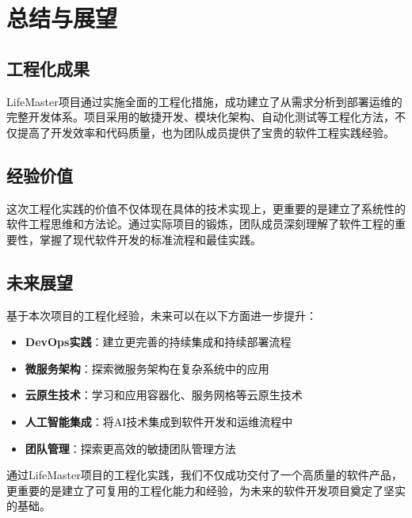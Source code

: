 \documentclass[a4paper]{article}
\begin{document}
\section{总结与展望}

\subsection{工程化成果}

LifeMaster项目通过实施全面的工程化措施，成功建立了从需求分析到部署运维的完整开发体系。项目采用的敏捷开发、模块化架构、自动化测试等工程化方法，不仅提高了开发效率和代码质量，也为团队成员提供了宝贵的软件工程实践经验。

\subsection{经验价值}

这次工程化实践的价值不仅体现在具体的技术实现上，更重要的是建立了系统性的软件工程思维和方法论。通过实际项目的锻炼，团队成员深刻理解了软件工程的重要性，掌握了现代软件开发的标准流程和最佳实践。

\subsection{未来展望}

基于本次项目的工程化经验，未来可以在以下方面进一步提升：

\begin{itemize}
    \item \textbf{DevOps实践}：建立更完善的持续集成和持续部署流程
    \item \textbf{微服务架构}：探索微服务架构在复杂系统中的应用
    \item \textbf{云原生技术}：学习和应用容器化、服务网格等云原生技术
    \item \textbf{人工智能集成}：将AI技术集成到软件开发和运维流程中
    \item \textbf{团队管理}：探索更高效的敏捷团队管理方法
\end{itemize}

通过LifeMaster项目的工程化实践，我们不仅成功交付了一个高质量的软件产品，更重要的是建立了可复用的工程化能力和经验，为未来的软件开发项目奠定了坚实的基础。

\label{LastPage}
\end{document}
